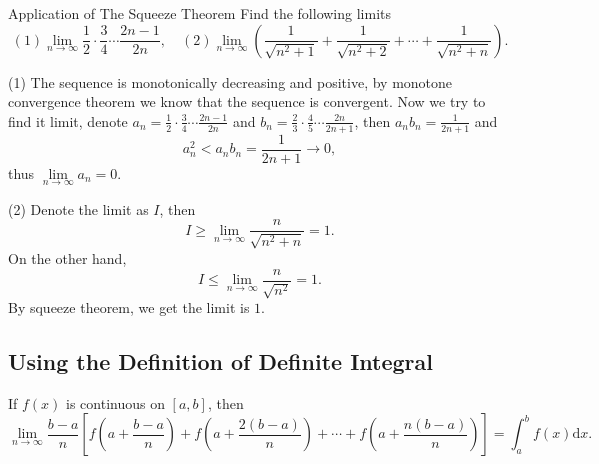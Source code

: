 \begin{example}{Application of The Squeeze Theorem}{}
  Find the following limits
  \begin{equation}
    (1) \lim \limits _{n \rightarrow \infty} \frac{1}{2} \cdot \frac{3}{4} \cdots \frac{2n-1}{2n}, \quad
    (2) \lim \limits _{n \rightarrow \infty} \left( \frac{1}{\sqrt{n^2 + 1}} + \frac{1}{\sqrt{n^2 + 2}} + \cdots + \frac{1}{\sqrt{n^2 + n}} \right).
  \end{equation}
\end{example}

\begin{solution}
  (1) The sequence is monotonically decreasing and positive,
  by monotone convergence theorem we know that the sequence is convergent.
  Now we try to find it limit,
  denote $a_n = \frac{1}{2} \cdot \frac{3}{4} \cdots \frac{2n-1}{2n}$ and $b_n =
  \frac{2}{3} \cdot \frac{4}{5} \cdots \frac{2n}{2n+1}$,
  then $a_n b_n = \frac{1}{2n+1}$ and
  \begin{equation}
    a_n^2 < a_n b_n = \frac{1}{2n+1} \rightarrow 0,
  \end{equation}
  thus $\lim \limits _{n \rightarrow \infty} a_n = 0$.

  (2) Denote the limit as $I$, then
  \begin{equation}
    I \geq \lim \limits _{n \rightarrow \infty} \frac{n}{\sqrt{n^2 + n}} = 1.
  \end{equation}
  On the other hand,
  \begin{equation}
    I \leq \lim \limits _{n \rightarrow \infty} \frac{n}{\sqrt{n^2}} = 1.
  \end{equation}
  By squeeze theorem, we get the limit is $1$.
\end{solution}

\subsection{Using the Definition of Definite Integral}

\begin{proposition}{}{}
  If $f(x)$ is continuous on $[a,b]$, then
  \begin{equation}
    \lim \limits _{n \rightarrow \infty} \frac{b - a}{n} \left[
      f(a + \frac{b - a}{n}) + f( a + \frac{2(b-a)}{n}) + \cdots + f(a + \frac{n(b-a)}{n})
    \right] = \int_a^b f(x) \mathrm{d} x.
  \end{equation}
\end{proposition}

